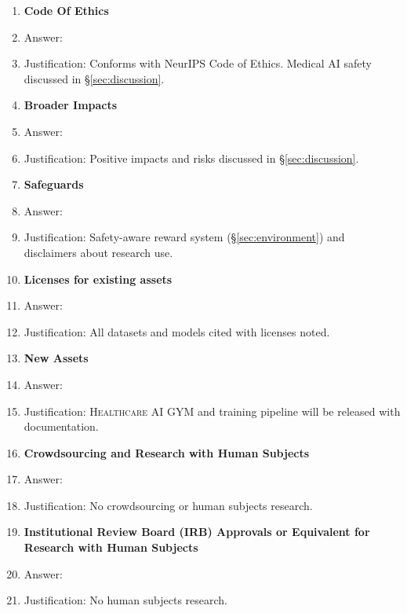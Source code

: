 \documentclass{article}
\newcommand{\gym}{\textsc{Healthcare AI GYM}}
\begin{document}
\begin{enumerate}
\item {\bf Code Of Ethics}
    \item[] Answer: \answerYes{}
    \item[] Justification: Conforms with NeurIPS Code of Ethics. Medical AI safety discussed in \S\ref{sec:discussion}.

\item {\bf Broader Impacts}
    \item[] Answer: \answerYes{}
    \item[] Justification: Positive impacts and risks discussed in \S\ref{sec:discussion}.

\item {\bf Safeguards}
    \item[] Answer: \answerYes{}
    \item[] Justification: Safety-aware reward system (\S\ref{sec:environment}) and disclaimers about research use.

\item {\bf Licenses for existing assets}
    \item[] Answer: \answerYes{}
    \item[] Justification: All datasets and models cited with licenses noted.

\item {\bf New Assets}
    \item[] Answer: \answerYes{}
    \item[] Justification: \gym{} and training pipeline will be released with documentation.

\item {\bf Crowdsourcing and Research with Human Subjects}
    \item[] Answer: \answerNA{}
    \item[] Justification: No crowdsourcing or human subjects research.

\item {\bf Institutional Review Board (IRB) Approvals or Equivalent for Research with Human Subjects}
    \item[] Answer: \answerNA{}
    \item[] Justification: No human subjects research.

\end{enumerate}
\end{document}

